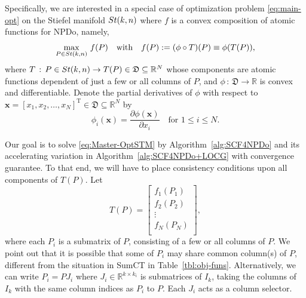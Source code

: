 \documentclass[11pt]{article}
\def\bx{\pmb{x}}
\def\bbR{\mathbb{R}}
\newcommand\STM[2]{{\rm St}(#1,#2)}
\DeclareMathOperator{\T}{T}
\theoremstyle{definition}
\numberwithin{equation}{section}
\begin{document}
Specifically, we are interested in a special case of optimization problem \eqref{eq:main-opt} on the Stiefel manifold $\STM{k}{n}$ where
$f$ is a convex composition of atomic functions for NPDo, namely,
\begin{equation}\label{eq:Master-OptSTM}
\max_{P\in\STM{k}{n}}\,f(P)\quad\mbox{with}\quad f(P):=(\phi\circ T)(P)\equiv\phi(T(P)),
\end{equation}
where $T\,:\, P\in\STM{k}{n} \to T(P)\in\mathfrak{D}\subseteq\bbR^N$ whose components are atomic functions
dependent of just a few or all columns of $P$,
and $\phi\,:\,\mathfrak{D}\to\bbR$ is
convex and differentiable.
Denote the partial derivatives of $\phi$
with respect to $\bx=[x_1,x_2,\ldots,x_N]^{\T}\in\mathfrak{D}\subseteq\bbR^N$ by
\begin{equation}\label{eq:phi-i}
\phi_i(\bx)=\frac {\partial \phi(\bx)}{\partial x_i}\quad\mbox{for $1\le i\le N$}.
\end{equation}

Our goal is to solve \eqref{eq:Master-OptSTM} by Algorithm~\ref{alg:SCF4NPDo} and its accelerating  variation in Algorithm~\ref{alg:SCF4NPDo+LOCG} with convergence guarantee. To that end, we
will have to place consistency conditions upon all components of $T(P)$.
Let
\begin{equation}\label{eq:T-general}
T(P)=\begin{bmatrix}
                                        f_1(P_1) \\
                                        f_2(P_2) \\
                                        \vdots \\
                                        f_N(P_N) \\
                                      \end{bmatrix},
\end{equation}
where each $P_i$ is a submatrix of $P$, consisting of a few or all columns of $P$.
We point out that
it is possible that some of  $P_i$ may share common column(s) of $P$, different from
the situation in SumCT in Table~\ref{tbl:obj-funs}. Alternatively, we can write $P_i=PJ_i$ where $J_i\in\bbR^{k\times k_i}$ is submatrices
      of $I_k$, taking the columns of $I_k$ with the same column indices as $P_i$
      to $P$. Each $J_i$ acts as a column selector.
\end{document}
